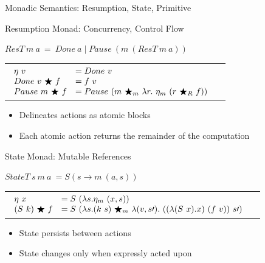 \documentclass{beamer}
\begin{document}
\begin{frame}{Monadic Semantics: Resumption, State, Primitive}

\begin{structure}{Resumption Monad: Concurrency, Control Flow}

\begin{onlinebox}{9cm}
\begin{flushleft}
$ResT\ m\ a\ =\ Done\ a \mid Pause\ (m\ (ResT\ m\ a))$\\
\smallskip
\begin{tabular}[t]{ll}
$
\begin{array}[t]{ll}
\eta\ v &= Done\ v\\
Done\ v\ \bigstar\ f &= f\ v\\
Pause\ m\ \bigstar\ f &= Pause\ (m\ \bigstar_m\ \lambda r.\ \eta_m\ (r\ \bigstar_R\ f))\\
\end{array}
$
\end{tabular}
\end{flushleft}
\end{onlinebox}

\smallskip

\begin{itemize}
\item{Delineates actions as atomic blocks}
\item{Each atomic action returns the remainder of the computation}
\end{itemize}

\end{structure}

\begin{structure}{State Monad: Mutable References}

\begin{onlinebox}{11cm}
\begin{flushleft}
$StateT\ s\ m\ a\ = S (s \rightarrow m\ (a,s))$\\
\smallskip
\begin{tabular}[t]{ll}
$
\begin{array}[t]{ll}
\eta\ x &= S\ (\lambda s . \eta_m\ (x, s))\\
(S\ k)\ \bigstar\ f &= S\ (\lambda s . (k\ s)\ \bigstar_m\ \lambda(v,s\prime).\ ((\lambda (S\ x).x)\ (f\ v))\ s\prime)\\
\end{array}
$
\end{tabular}
\end{flushleft}

\end{onlinebox}

\begin{itemize}
\item{State persists between actions}
\item{State changes only when expressly acted upon}
\end{itemize}

\end{structure}

\medskip

\emph{\color{red}{Everything not in one of these monads is primitive!}}


\end{frame}
\end{document}

